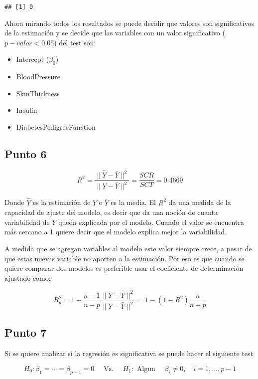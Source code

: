 \documentclass[
]{article}
\begin{document}
\begin{verbatim}
## [1] 0
\end{verbatim}

Ahora mirando todos los resultados se puede decidir que valores son
significativos de la estimación y se decide que las variables con un
valor significativo (\(p-valor < 0.05\)) del test son:

\begin{itemize}
\item
  Intercept (\(\beta_0\))
\item
  BloodPressure
\item
  SkinThickness
\item
  Insulin
\item
  DiabetesPedigreeFunction
\end{itemize}

\hypertarget{punto-6}{%
\subsection{Punto 6}\label{punto-6}}

\[
R^{2}=\frac{\|\hat{Y}-\bar{Y}\|^{2}}{\|Y-\bar{Y}\|^{2}}=\frac{S C R}{S C T}= 0.4669
\]

Donde \(\hat Y\) es la estimación de \(Y\) e \(\bar Y\) es la media. El
\(R^2\) da una medida de la capacidad de ajuste del modelo, es decir que
da una noción de cuanta variabilidad de \(Y\) queda explicada por el
modelo. Cuando el valor se encuentra más cercano a 1 quiere decir que el
modelo explica mejor la variabilidad.

A medida que se agregan variables al modelo este valor siempre crece, a
pesar de que estas nuevas variable no aporten a la estimación. Por eso
es que cuando se quiere comparar dos modelos es preferible usar el
coeficiente de determinación ajustado como:

\[
R_{a}^{2}=1-\frac{n-1}{n-p} \frac{\|Y-\hat{Y}\|^{2}}{\|Y-\bar{Y}\|^{2}}=1-\left(1-R^{2}\right) \frac{n}{n-p}
\]

\hypertarget{punto-7}{%
\subsection{Punto 7}\label{punto-7}}

Si se quiere analizar si la regresión es significativa se puede hacer el
siguiente test

\[H_{0}: \beta_{1}=\cdots=\beta_{p-1}=0 \quad \text { Vs. } \quad H_{1}: \text { Algun } \quad \beta_{i} \neq 0, \quad i=1, \ldots, p-1\]
\end{document}

